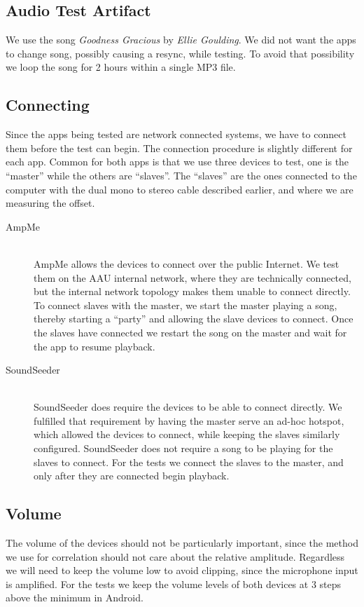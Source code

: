 \subsection{Audio Test Artifact}\label{subsec:audiotestartifact}
We use the song \textit{Goodness Gracious} by \textit{Ellie Goulding}. We did not
want the apps to change song, possibly causing a resync, while testing.
To avoid that possibility we loop the song for 2 hours within
a single MP3 file.

\subsection{Connecting}
Since the apps being tested are network connected systems, we have to
connect them before the test can begin. The connection procedure is
slightly different for each app. Common for both apps is that we use
three devices to test, one is the ``master'' while the others are
``slaves''. The ``slaves'' are the ones connected to the computer
with the dual mono to stereo cable described earlier, and where we are
measuring the offset.

\begin{description}
    \item[AmpMe] \hfill\\
AmpMe allows the devices to connect over the public Internet. We test
them on the AAU internal network, where they are technically connected,
but the internal network topology makes them unable to connect directly.
To connect slaves with the master, we start the master playing a song,
thereby starting a ``party'' and allowing the slave devices to
connect. Once the slaves have connected we restart the song on the
master and wait for the app to resume playback.

    \item[SoundSeeder] \hfill\\
SoundSeeder does require the devices to be able to connect directly. We
fulfilled that requirement by having the master serve an ad-hoc hotspot,
which allowed the devices to connect, while keeping the slaves
similarly configured. SoundSeeder does not require a song to be playing
for the slaves to connect. For the tests we connect the slaves to the master,
and only after they are connected begin playback.
\end{description}

\subsection{Volume}
The volume of the devices should not be particularly important, since
the method we use for correlation should not care about the relative
amplitude. Regardless we will need to keep the volume low to avoid
clipping, since the microphone input is amplified. For the tests we keep
the volume levels of both devices at 3 steps above the minimum in
Android.

